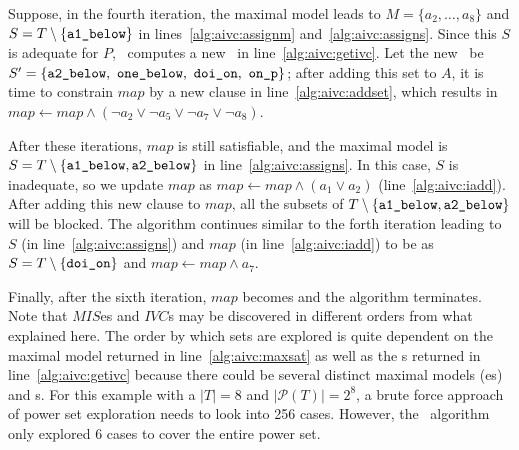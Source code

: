 Suppose, in the fourth iteration, the maximal model leads to $M = \{a_2, \ldots, a_8\}$ and
$S = T \setminus \{ {\small \texttt{a1\_below}}\} $ in lines~\ref{alg:aivc:assignm} and~\ref{alg:aivc:assigns}.
Since this $S$ is adequate for $P$, \getivc ~computes a new \mivc\ in line~\ref{alg:aivc:getivc}.
Let the new \mivc\ be $S' = \{ {\small \texttt{a2\_below},~\texttt{one\_below}, ~\texttt{doi\_on},~\texttt{on\_p}}\}$; after adding this set to $A$,
it is time to constrain $map$ by a new clause in line~\ref{alg:aivc:addset},
which results in $map \leftarrow map \wedge (\neg a_2 \vee \neg a_5 \vee \neg a_7 \vee \neg a_8)$.

After these iterations, $map$ is still satisfiable, and the maximal model is
 $S = T \setminus \{ { \small \texttt{a1\_below}}, { \small \texttt{a2\_below}}\}$ in line~\ref{alg:aivc:assigns}.
In this case, $S$ is inadequate, so we update $map$ as
$map \leftarrow map \wedge (a_1 \vee a_2)$ (line~\ref{alg:aivc:iadd}). After adding this new clause to $map$,
all the subsets of $T \setminus \{ { \small \texttt{a1\_below}}, {\small \texttt{a2\_below}}\}$
will be blocked. The algorithm continues similar to the forth iteration leading to $S$ (in line~\ref{alg:aivc:assigns}) and $map$ (in line~\ref{alg:aivc:iadd}) to be as
 $S = T \setminus \{ {\small  \texttt{doi\_on}}\}$ and $map \leftarrow map \wedge a_7$.

Finally, after the sixth iteration, $map$ becomes \unsat and the algorithm terminates.
Note that $MIS$es and $IVC$s may be discovered in different orders from what explained here. The order by which sets are explored is
quite dependent on the maximal model returned in line~\ref{alg:aivc:maxsat} as well as the \mivc s returned in line~\ref{alg:aivc:getivc} because there could be several distinct maximal models (\mis es) and \mivc s. For this example with a $|T| = 8$ and $|\mathcal{P}(T)| = 2^8$, a brute force approach of power set exploration needs to look into  256 cases. However, the \aivcalg ~algorithm only explored 6 cases to cover the entire power set. %



